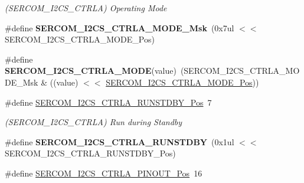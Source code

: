 \begin{DoxyCompactItemize}
\begin{DoxyCompactList}\small\item\em (S\+E\+R\+C\+O\+M\+\_\+\+I2\+C\+S\+\_\+\+C\+T\+R\+L\+A) Operating Mode \end{DoxyCompactList}\item 
\hypertarget{group___s_a_m_l21___s_e_r_c_o_m_ga8a08b326227ab028218df490044217cb}{}\#define {\bfseries S\+E\+R\+C\+O\+M\+\_\+\+I2\+C\+S\+\_\+\+C\+T\+R\+L\+A\+\_\+\+M\+O\+D\+E\+\_\+\+Msk}~(0x7ul $<$$<$ S\+E\+R\+C\+O\+M\+\_\+\+I2\+C\+S\+\_\+\+C\+T\+R\+L\+A\+\_\+\+M\+O\+D\+E\+\_\+\+Pos)\label{group___s_a_m_l21___s_e_r_c_o_m_ga8a08b326227ab028218df490044217cb}

\item 
\hypertarget{group___s_a_m_l21___s_e_r_c_o_m_ga1564293aee43a944b841bdee2ec81cb5}{}\#define {\bfseries S\+E\+R\+C\+O\+M\+\_\+\+I2\+C\+S\+\_\+\+C\+T\+R\+L\+A\+\_\+\+M\+O\+D\+E}(value)~(S\+E\+R\+C\+O\+M\+\_\+\+I2\+C\+S\+\_\+\+C\+T\+R\+L\+A\+\_\+\+M\+O\+D\+E\+\_\+\+Msk \& ((value) $<$$<$ \hyperlink{group___s_a_m_l21___s_e_r_c_o_m_ga28b25756139973e68744537e28f53c09}{S\+E\+R\+C\+O\+M\+\_\+\+I2\+C\+S\+\_\+\+C\+T\+R\+L\+A\+\_\+\+M\+O\+D\+E\+\_\+\+Pos}))\label{group___s_a_m_l21___s_e_r_c_o_m_ga1564293aee43a944b841bdee2ec81cb5}

\item 
\hypertarget{group___s_a_m_l21___s_e_r_c_o_m_ga74d58a33687a13e36579eca322beb1e6}{}\#define \hyperlink{group___s_a_m_l21___s_e_r_c_o_m_ga74d58a33687a13e36579eca322beb1e6}{S\+E\+R\+C\+O\+M\+\_\+\+I2\+C\+S\+\_\+\+C\+T\+R\+L\+A\+\_\+\+R\+U\+N\+S\+T\+D\+B\+Y\+\_\+\+Pos}~7\label{group___s_a_m_l21___s_e_r_c_o_m_ga74d58a33687a13e36579eca322beb1e6}

\begin{DoxyCompactList}\small\item\em (S\+E\+R\+C\+O\+M\+\_\+\+I2\+C\+S\+\_\+\+C\+T\+R\+L\+A) Run during Standby \end{DoxyCompactList}\item 
\hypertarget{group___s_a_m_l21___s_e_r_c_o_m_ga4b985e56416866fea3b16095bacb4b15}{}\#define {\bfseries S\+E\+R\+C\+O\+M\+\_\+\+I2\+C\+S\+\_\+\+C\+T\+R\+L\+A\+\_\+\+R\+U\+N\+S\+T\+D\+B\+Y}~(0x1ul $<$$<$ S\+E\+R\+C\+O\+M\+\_\+\+I2\+C\+S\+\_\+\+C\+T\+R\+L\+A\+\_\+\+R\+U\+N\+S\+T\+D\+B\+Y\+\_\+\+Pos)\label{group___s_a_m_l21___s_e_r_c_o_m_ga4b985e56416866fea3b16095bacb4b15}

\item 
\hypertarget{group___s_a_m_l21___s_e_r_c_o_m_gac67e0decf152fa11dca309a3fd7eda4c}{}\#define \hyperlink{group___s_a_m_l21___s_e_r_c_o_m_gac67e0decf152fa11dca309a3fd7eda4c}{S\+E\+R\+C\+O\+M\+\_\+\+I2\+C\+S\+\_\+\+C\+T\+R\+L\+A\+\_\+\+P\+I\+N\+O\+U\+T\+\_\+\+Pos}~16\label{group___s_a_m_l21___s_e_r_c_o_m_gac67e0decf152fa11dca309a3fd7eda4c}


\end{DoxyCompactItemize}
